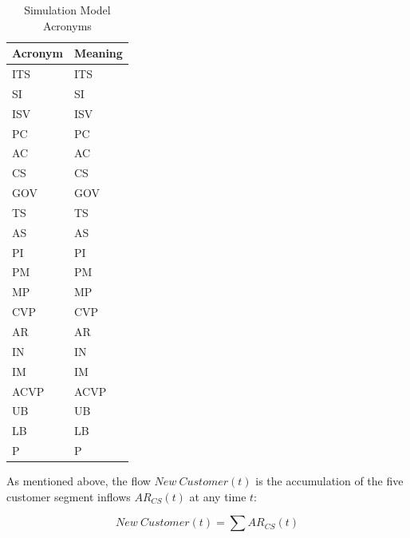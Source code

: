 \begin{table}[t]
	\centering
	\begin{tabular}{ll}
			\toprule 
			\footnotesize \textbf{Acronym} & \footnotesize \textbf{Meaning}	 \\ \midrule
			\footnotesize \acs{ITS} & \footnotesize \acl{ITS}\\
			\footnotesize \acs{SI} & \footnotesize \acl{SI}\\
			\footnotesize \acs{ISV} & \footnotesize \acl{ISV}\\
			\footnotesize \acs{PC} & \footnotesize \acl{PC}\\
			\footnotesize \acs{AC} & \footnotesize \acl{AC}\\ 
			\footnotesize \acs{CS} & \footnotesize \acl{CS}\\ \midrule
			\footnotesize \acs{GOV} & \footnotesize \acl{GOV}\\
			\footnotesize \acs{TS} & \footnotesize \acl{TS}\\
			\footnotesize \acs{AS} & \footnotesize \acl{AS}\\ \midrule
			\footnotesize \acs{PI} & \footnotesize \acl{PI}\\
			\footnotesize \acs{PM} & \footnotesize \acl{PM}\\
			\footnotesize \acs{MP} & \footnotesize \acl{MP}\\ \midrule
			\footnotesize \acs{CVP} & \footnotesize \acl{CVP}\\
			\footnotesize \acs{AR} & \footnotesize \acl{AR} \\ 
			\footnotesize \acs{IN} & \footnotesize \acl{IN} \\ 
			\footnotesize \acs{IM} & \footnotesize \acl{IM} \\ 
			\footnotesize \acs{ACVP} & \footnotesize \acl{ACVP} \\ 
			\footnotesize \acs{UB} & \footnotesize \acl{UB} \\
			\footnotesize \acs{LB} & \footnotesize \acl{LB}\\
			\footnotesize \acs{P} & \footnotesize \acl{P}\\ \bottomrule
	\end{tabular}
	\caption{Simulation Model Acronyms}
	\label{tab:acro}
\end{table}

As mentioned above, the flow $New~Customer(t)$ is the accumulation of the five customer segment inflows $AR_{CS}(t)$ at any time $t$:

\begin{equation}\label{eq:nc}
	\mathit{New~Customer(t)} = \sum AR_{CS}(t)
\end{equation}

